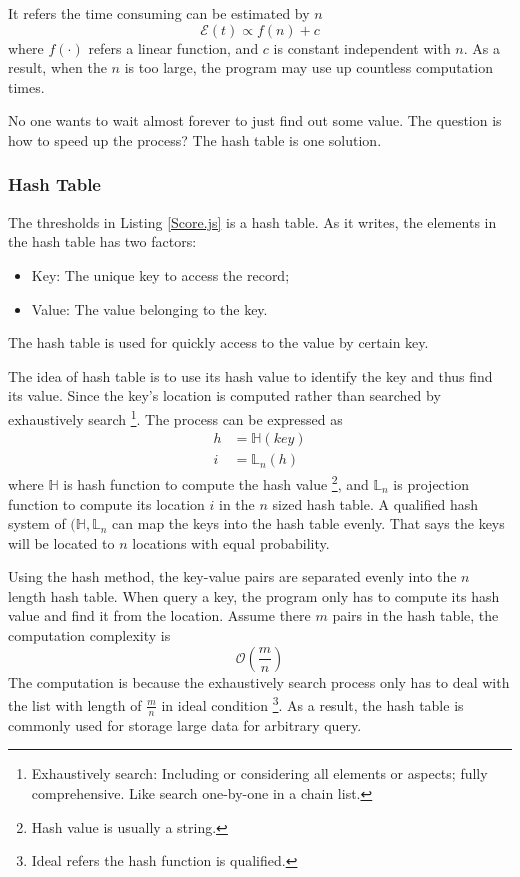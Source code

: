 It refers the time consuming can be estimated by $n$
\begin{equation*}
    \mathcal{E}(t) \propto f(n) + c
\end{equation*}
where $f(\cdot)$ refers a linear function, and $c$ is constant independent with $n$.
As a result, when the $n$ is too large, the program may use up countless computation times.

No one wants to wait almost forever to just find out some value.
The question is how to speed up the process?
The hash table is one solution.

\subsubsection{Hash Table}

The thresholds in Listing \ref{Score.js} is a hash table.
As it writes, the elements in the hash table has two factors:
\begin{itemize}
    \item Key: The unique key to access the record;
    \item Value: The value belonging to the key.
\end{itemize}
The hash table is used for quickly access to the value by certain key.

The idea of hash table is to use its hash value to identify the key and thus find its value.
Since the key's location is computed rather than searched by exhaustively search
\footnote{
    Exhaustively search: Including or considering all elements or aspects; fully comprehensive.
    Like search one-by-one in a chain list.
}.
The process can be expressed as
\begin{align*}
    h & = \mathbb{H} (key) \\
    i & = \mathbb{L}_n (h)
\end{align*}
where $\mathbb{H}$ is hash function to compute the hash value
\footnote{
    Hash value is usually a string.
},
and $\mathbb{L}_n$ is projection function to compute its location $i$ in the $n$ sized hash table.
A qualified hash system of $(\mathbb{H}, \mathbb{L}_n$ can map the keys into the hash table evenly.
That says the keys will be located to $n$ locations with equal probability.

Using the hash method, the key-value pairs are separated evenly into the $n$ length hash table.
When query a key, the program only has to compute its hash value and find it from the location.
Assume there $m$ pairs in the hash table, the computation complexity is
\begin{equation}
    \label{Eq: cc-o2}
    \mathcal{O}(\frac{m}{n})
\end{equation}
The computation is because the exhaustively search process only has to deal with the list with length of $\frac{m}{n}$ in ideal condition
\footnote{
    Ideal refers the hash function is qualified.
}.
As a result, the hash table is commonly used for storage large data for arbitrary query.

